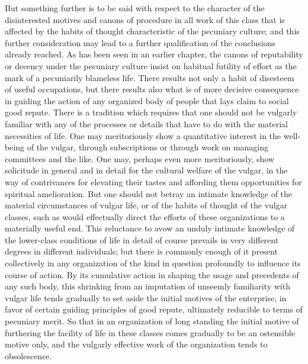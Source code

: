 \documentclass[12pt]{report}
\begin{document}
But something further is to be said with respect to the character of the
disinterested motives and canons of procedure in all work of this
class that is affected by the habits of thought characteristic of the
pecuniary culture; and this further consideration may lead to a further
qualification of the conclusions already reached. As has been seen in
an earlier chapter, the canons of reputability or decency under the
pecuniary culture insist on habitual futility of effort as the mark of a
pecuniarily blameless life. There results not only a habit of disesteem
of useful occupations, but there results also what is of more decisive
consequence in guiding the action of any organized body of people that
lays claim to social good repute. There is a tradition which requires
that one should not be vulgarly familiar with any of the processes or
details that have to do with the material necessities of life. One may
meritoriously show a quantitative interest in the well-being of the
vulgar, through subscriptions or through work on managing committees and
the like. One may, perhaps even more meritoriously, show solicitude in
general and in detail for the cultural welfare of the vulgar, in the
way of contrivances for elevating their tastes and affording them
opportunities for spiritual amelioration. But one should not betray an
intimate knowledge of the material circumstances of vulgar life, or of
the habits of thought of the vulgar classes, such as would effectually
direct the efforts of these organizations to a materially useful end.
This reluctance to avow an unduly intimate knowledge of the lower-class
conditions of life in detail of course prevails in very different
degrees in different individuals; but there is commonly enough of
it present collectively in any organization of the kind in question
profoundly to influence its course of action. By its cumulative action
in shaping the usage and precedents of any such body, this shrinking
from an imputation of unseemly familiarity with vulgar life tends
gradually to set aside the initial motives of the enterprise, in favor
of certain guiding principles of good repute, ultimately reducible to
terms of pecuniary merit. So that in an organization of long standing
the initial motive of furthering the facility of life in these classes
comes gradually to be an ostensible motive only, and the vulgarly
effective work of the organization tends to obsolescence.
\end{document}
